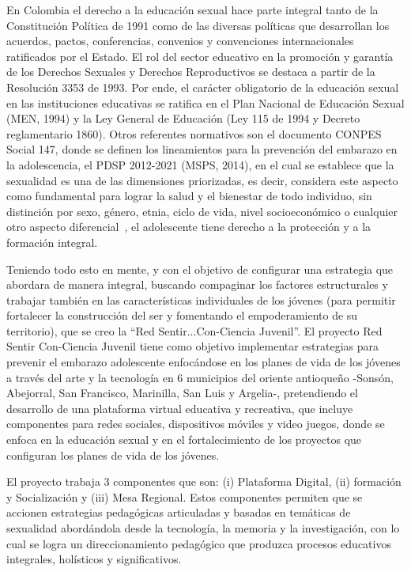 \documentclass[a4paper]{article}
\begin{document}
En Colombia el derecho a la educación sexual hace parte integral tanto de la Constitución Política de 1991 como de las diversas políticas que desarrollan los acuerdos, pactos, conferencias, convenios y convenciones internacionales ratificados por el Estado. El rol del sector educativo en la promoción y garantía de los Derechos Sexuales y Derechos Reproductivos se destaca a partir de la Resolución 3353 de 1993. Por ende, el carácter obligatorio de la educación sexual en las instituciones educativas se ratifica en el Plan Nacional de Educación Sexual (MEN, 1994) y la Ley General de Educación (Ley  115  de 1994 y Decreto reglamentario 1860). Otros referentes normativos son el documento CONPES Social 147, donde se definen los lineamientos para la prevención del embarazo en la adolescencia, el PDSP 2012-2021 (MSPS, 2014), en el cual  se  establece que la sexualidad es una de las dimensiones priorizadas, es decir, considera este aspecto como fundamental para lograr la salud y el bienestar de todo individuo, sin distinción por sexo, género, etnia, ciclo de vida, nivel socioeconómico o cualquier otro aspecto diferencial~\citep{Pro2015II}, el adolescente tiene derecho a la protección y a la formación integral.

Teniendo todo esto en mente, y con el objetivo de configurar una estrategia que abordara de manera integral, buscando compaginar los factores estructurales y trabajar también en las características individuales de los jóvenes (para permitir fortalecer la construcción del ser y fomentando el empoderamiento de su territorio), que se creo la ``Red Sentir...Con-Ciencia Juvenil''. El proyecto Red Sentir Con-Ciencia Juvenil tiene como objetivo implementar estrategias para prevenir el embarazo adolescente enfocándose en los planes de vida de los jóvenes a través del arte y la tecnología en 6 municipios del oriente antioqueño -Sonsón, Abejorral, San Francisco, Marinilla, San Luis y Argelia-, pretendiendo el desarrollo de una plataforma virtual educativa y recreativa, que incluye componentes para redes sociales, dispositivos móviles y video juegos, donde se enfoca en la educación sexual y en el fortalecimiento de los proyectos que configuran los planes de vida de los jóvenes.

El proyecto trabaja 3 componentes que son: (i) Plataforma Digital, (ii) formación y Socialización y (iii) Mesa Regional. Estos componentes permiten que se accionen estrategias pedagógicas articuladas y basadas en temáticas de sexualidad abordándola desde la tecnología, la memoria y la investigación, con lo cual se logra un direccionamiento pedagógico que produzca procesos educativos integrales, holísticos y significativos. 
\end{document}
